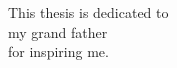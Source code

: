 \begin{dedication}
This thesis is dedicated to\\
my grand father\\
for inspiring me.\\
\end{dedication}
